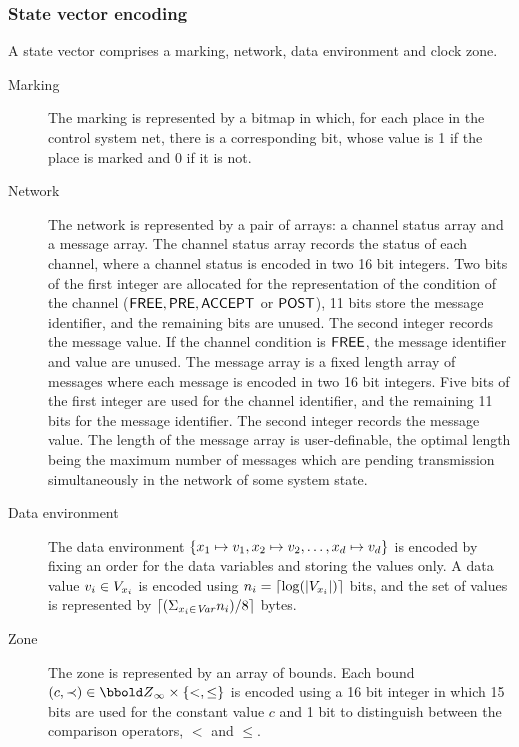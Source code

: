\subsubsection{State vector encoding}
A state vector comprises a marking, network, data environment 
and clock zone.  
\begin{description}
\item[Marking] The marking is represented by a bitmap in which, for
each place in the control system net, there is a corresponding bit,
whose value is 1 if the place is marked and 0 if it is not. 
\item[Network] The network is represented by a pair of arrays: a channel
status array and a message array.  The channel status array records
the status of each channel, where a channel status is encoded in two
16 bit integers. Two bits of the first integer are allocated for the
representation of the condition of the channel (${\sf FREE}, {\sf PRE}, {\sf ACCEPT}$ or 
${\sf POST}$), 11 bits store 
the message identifier, and the remaining bits are unused. The second
integer records the message value.  If the channel condition is
${\sf FREE}$, the message identifier and value are unused. 
The message array is a fixed length array of messages where each
message is encoded in two 16 bit integers.  Five bits of the first
integer are used for the channel identifier, and the remaining 11
bits for the message identifier. The second integer records the
message value. The length of the message array is user-definable, the
optimal length being the maximum number of messages which are pending
transmission simultaneously in the network of some system state.
\item[Data environment] The data environment
$\{x_1\mapsto{v}_1,x_2\mapsto{v}_2,\ldots,x_d\mapsto{v}_d\}$ is
encoded by fixing an order for the data variables and storing the
values only. A data value ${v}_i \in V_{x_i}$ is encoded using $n_i
= \lceil\log({\left|V_{x_i}\right|})\rceil$ bits, and the set of values is
represented by $\lceil(\Sigma_{x_i \in {\text{\it Var\/}}} n_i) / 8\rceil$ bytes.
\item[Zone] The zone is represented by an array of bounds. Each bound
$(c,\brel) \in \Zinf \cross \{<, \leq\}$ is encoded using a 16 bit
integer in which 15 bits are used for the constant value $c$ and 1 bit
to distinguish between the comparison operators, $<$ and $\leq$.
\end{description}

